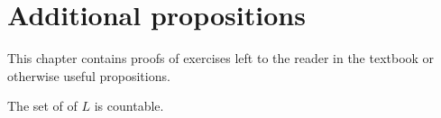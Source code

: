 \chapter{Additional propositions}

This chapter contains proofs of exercises left to the reader in the textbook or otherwise useful propositions.

\begin{proposition}
  The set of \wfs{} of \(L\) is countable.
\end{proposition}
